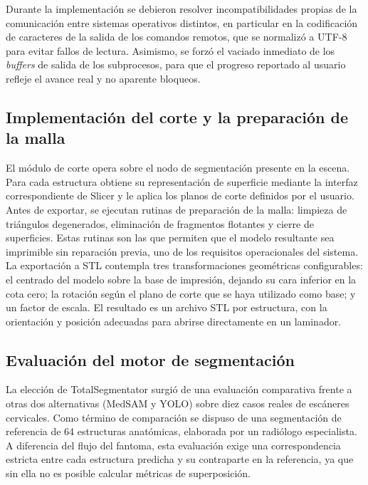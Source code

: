 Durante la implementación se debieron resolver incompatibilidades propias de la comunicación entre sistemas operativos distintos, en particular en la codificación de caracteres de la salida de los comandos remotos, que se normalizó a UTF-8 para evitar fallos de lectura. Asimismo, se forzó el vaciado inmediato de los \textit{buffers} de salida de los subprocesos, para que el progreso reportado al usuario refleje el avance real y no aparente bloqueos.\\

\subsection{Implementación del corte y la preparación de la malla}

El módulo de corte opera sobre el nodo de segmentación presente en la escena. Para cada estructura obtiene su representación de superficie mediante la interfaz correspondiente de Slicer y le aplica los planos de corte definidos por el usuario. Antes de exportar, se ejecutan rutinas de preparación de la malla: limpieza de triángulos degenerados, eliminación de fragmentos flotantes y cierre de superficies. Estas rutinas son las que permiten que el modelo resultante sea imprimible sin reparación previa, uno de los requisitos operacionales del sistema.\\

La exportación a STL contempla tres transformaciones geométricas configurables: el centrado del modelo sobre la base de impresión, dejando su cara inferior en la cota cero; la rotación según el plano de corte que se haya utilizado como base; y un factor de escala. El resultado es un archivo STL por estructura, con la orientación y posición adecuadas para abrirse directamente en un laminador.\\

\subsection{Evaluación del motor de segmentación}

La elección de TotalSegmentator surgió de una evaluación comparativa frente a otras dos alternativas (MedSAM y YOLO) sobre diez casos reales de escáneres cervicales. Como término de comparación se dispuso de una segmentación de referencia de 64 estructuras anatómicas, elaborada por un radiólogo especialista. A diferencia del flujo del fantoma, esta evaluación exige una correspondencia estricta entre cada estructura predicha y su contraparte en la referencia, ya que sin ella no es posible calcular métricas de superposición.\\

